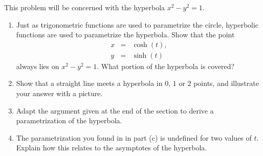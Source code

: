 \begin{exercise}{5}
    This problem will be concerned with the hyperbola $x^2 - y^2 = 1$.
    \begin{enumerate}
        \item Just as trigonometric functions are used to parametrize the circle, hyperbolic functions are used to parametrize the hyperbola. Show that the point
        \begin{eqnarray*}
            x & = & \cosh(t),\\
            y & = & \sinh(t)
        \end{eqnarray*}
        always lies on $x^2 - y^2 = 1$. What portion of the hyperbola is covered?
        \item Show that a straight line meets a hyperbola in $0$, $1$ or $2$ points, and illustrate your answer with a picture.
        \item Adapt the argument given at the end of the section to derive a parametrization of the hyperbola.
        \item The parametrization you found in in part (c) is undefined for two values of $t$. Explain how this relates to the asymptotes of the hyperbola.
    \end{enumerate}
\end{exercise}

